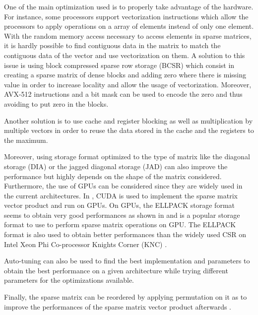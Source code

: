 One of the main optimization used is to properly take advantage of the hardware.
For instance, some processors support vectorization instructions which allow the processors to apply operations on a array of elements instead of only one element.
With  the random memory access necessary to access elements in sparse matrices, it is hardly possible to find contiguous data in the matrix to match the contiguous data of the vector and use vectorization on them.
A solution to this issue is using block compressed sparse row storage (BCSR) \cite{PinaH1999} which consist in creating a sparse matrix of dense blocks and adding zero where there is missing value in order to increase locality \cite{Toledo1997} and allow the usage of vectorization.
Moreover, AVX-512 instructions and a bit mask can be used to encode the zero \cite{BramK2018} and thus avoiding to put zero in the blocks.

Another solution is to use cache and register blocking as well as multiplication by multiple vectors \cite{Vuduc2003phd} \cite{Im2000phd} in order to reuse the data stored in the cache and the registers to the maximum.


Moreover, using storage format optimized to the type of matrix like the diagonal storage (DIA) \cite{Saad1990}  or the jagged diagonal storage (JAD) \cite{Saad2003} can also improve the performance but highly depends on the shape of the matrix considered.
Furthermore, the use of GPUs can be considered since they are widely used in the current architectures.
In \cite{NiBGS2008}, CUDA \cite{Shane2012} is used to implement the sparse matrix vector product and run on GPUs.
On GPUs, the ELLPACK storage format seems to obtain very good performances as shown in \cite{HuguP2010} and is a popular storage format to use to perform sparse matrix operations on GPU.
The ELLPACK format is also used to obtain better performances than the widely used CSR on Intel Xeon Phi Co-processor Knights Corner (KNC) \cite{LiSCD2013}.


Auto-tuning can also be used to find the best implementation and parameters to obtain the best performance on a given architecture \cite{WOVSY2009} while trying different parameters for the optimizations available.

Finally, the sparse matrix can be reordered by applying permutation on it as to improve the performances of the sparse matrix vector product afterwards \cite{PinaH1999} \cite{VuduM2005}.


